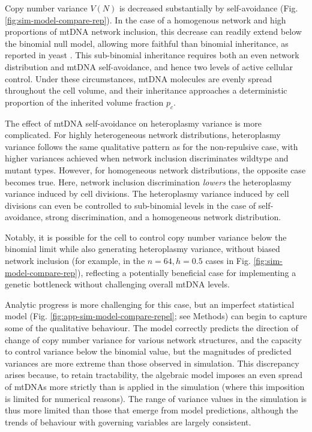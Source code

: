 \documentclass{article}
\begin{document}
Copy number variance $V(N)$ is decreased substantially by self-avoidance (Fig. \ref{fig:sim-model-compare-rep}). In the case of a homogenous network and high proportions of mtDNA network inclusion, this decrease can readily extend below the binomial null model, allowing more faithful than binomial inheritance, as reported in yeast \citep{jajoo2016accurate}. This sub-binomial inheritance requires both an even network distribution and mtDNA self-avoidance, and hence two levels of active cellular control. Under these circumstances, mtDNA molecules are evenly spread throughout the cell volume, and their inheritance approaches a deterministic proportion of the inherited volume fraction $p_c$.

The effect of mtDNA self-avoidance on heteroplasmy variance is more complicated. For highly heterogeneous network distributions, heteroplasmy variance follows the same qualitative pattern as for the non-repulsive case, with higher variances achieved when network inclusion discriminates wildtype and mutant types. However, for homogeneous network distributions, the opposite case becomes true. Here, network inclusion discrimination \emph{lowers} the heteroplasmy variance induced by cell divisions. The heteroplasmy variance induced by cell divisions can even be controlled to sub-binomial levels in the case of self-avoidance, strong discrimination, and a homogeneous network distribution.

Notably, it is possible for the cell to control copy number variance below the binomial limit while also generating heteroplasmy variance, without biased network inclusion (for example, in the $n = 64, h = 0.5$ cases in Fig. \ref{fig:sim-model-compare-rep}), reflecting a potentially beneficial case for implementing a genetic bottleneck without challenging overall mtDNA levels.

Analytic progress is more challenging for this case, but an imperfect statistical model (Fig. \ref{fig:app-sim-model-compare-repel}; see Methods) can begin to capture some of the qualitative behaviour. The model correctly predicts the direction of change of copy number variance for various network structures, and the capacity to control variance below the binomial value, but the magnitudes of predicted variances are more extreme than those observed in simulation. This discrepancy arises because, to retain tractability, the algebraic model imposes an even spread of mtDNAs more strictly than is applied in the simulation (where this imposition is limited for numerical reasons). The range of variance values in the simulation is thus more limited than those that emerge from model predictions, although the trends of behaviour with governing variables are largely consistent.
\end{document}
